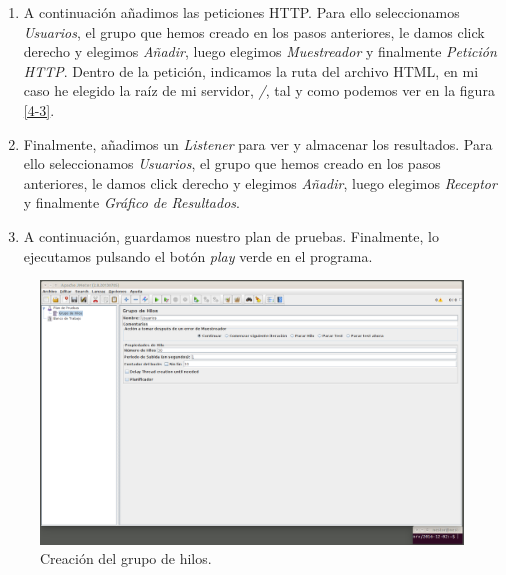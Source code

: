 \documentclass[a4paper,titlepage,12pt]{scrartcl}	%
\numberwithin{figure}{section} %
\numberwithin{table}{section} %
\begin{document}
\begin{enumerate}
		\item A continuación añadimos las peticiones HTTP. Para ello seleccionamos \textit{Usuarios}, el grupo que hemos creado en los pasos anteriores, le damos click derecho y elegimos \textit{Añadir}, luego elegimos \textit{Muestreador} y finalmente \textit{Petición HTTP}. Dentro de la petición, indicamos la ruta del archivo HTML, en mi caso he elegido la raíz de mi servidor, \textit{/}, tal y como podemos ver en la figura \ref{4-3}.
		\item Finalmente, añadimos un \textit{Listener} para ver y almacenar los resultados. Para ello seleccionamos \textit{Usuarios}, el grupo que hemos creado en los pasos anteriores, le damos click derecho y elegimos \textit{Añadir}, luego elegimos \textit{Receptor} y finalmente \textit{Gráfico de Resultados}.
		\item A continuación, guardamos nuestro plan de pruebas. Finalmente, lo ejecutamos pulsando el botón \textit{play} verde en el programa.
	\end{enumerate}
	
	\begin{figure}[H]
		\includegraphics[width=\linewidth]{./Imagenes/4-1.png}
		\vspace{-0.5cm}
		\caption[Creación del grupo de hilos.]{Creación del grupo de hilos.}
		\label{4-1}
	\end{figure}
	
\end{document}
